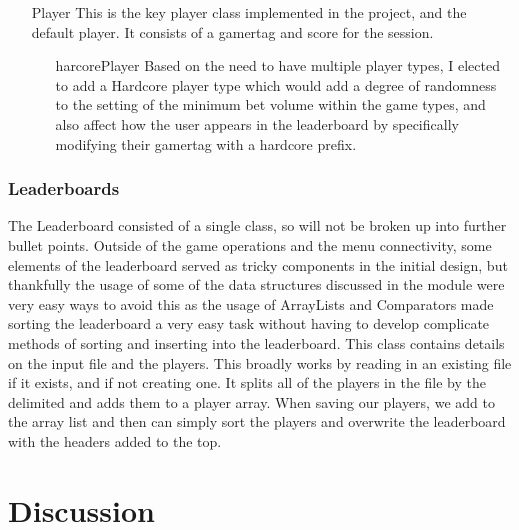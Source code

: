 \documentclass{scrreprt}
\begin{document}
\begin{itemize}
	\item[Player] This is the key player class implemented in the project, and the default player. It consists of a gamertag and score for the session.
	
	\begin{itemize}
		\item[harcorePlayer] Based on the need to have multiple player types, I elected to add a Hardcore player type which would add a degree of randomness to the setting of the minimum bet volume within the game types, and also affect how the user appears in the leaderboard by specifically modifying their gamertag with a hardcore prefix.
	\end{itemize}
\end{itemize}

\subsection{Leaderboards}
The Leaderboard consisted of a single class, so will not be broken up into further bullet points. Outside of the game operations and the menu connectivity, some elements of the leaderboard served as tricky components in the initial design, but thankfully the usage of some of the data structures discussed in the module were very easy ways to avoid this as the usage of ArrayLists and Comparators made sorting the leaderboard a very easy task without having to develop complicate methods of sorting and inserting into the leaderboard. This class contains details on the input file and the players. This broadly works by reading in an existing file if it exists, and if not creating one. It splits all of the players in the file by the delimited and adds them to a player array. When saving our players, we add to the array list and then can simply sort the players and overwrite the leaderboard with the headers added to the top.


\chapter{Discussion}\label{Discussion}
\end{document}
